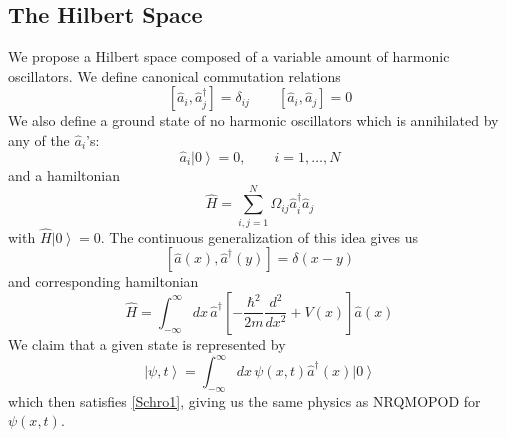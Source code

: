 \documentclass[10pt]{article}
\newcommand{\ket}[1]{\left|#1\right>}
\begin{document}
	\subsection{The Hilbert Space} 
	We propose a Hilbert space composed of a variable amount of harmonic oscillators. We define canonical commutation relations
	\begin{equation}\label{ccrs1} \left[\hat{a}_i,\hat{a}^\dag_j\right]=\delta_{ij} \qquad \left[\hat{a}_i, \hat{a}_j\right] = 0\end{equation}
	We also define a ground state of no harmonic oscillators which is annihilated by any of the $\hat{a}_i$'s:
	\begin{equation}\label{ground1} \hat{a}_i\ket{0} = 0,\qquad i=1,\ldots,N\end{equation}
	and a hamiltonian
	\begin{equation}\label{ham1} \hat{H} = \sum_{i,j=1}^N \Omega_{ij}\hat{a}^\dag_i\hat{a}_j\end{equation}
	with $\hat{H}\ket{0} = 0$. The continuous generalization of this idea gives us
	\begin{equation}\label{ccrs2} \left[\hat{a}(x), \hat{a}^\dag(y)\right] = \delta(x-y)\end{equation}
	and corresponding hamiltonian
	\begin{equation}\label{ham2} \hat{H} = \int_{-\infty}^\infty dx\,\hat{a}^\dag \left[-\frac{\hbar^2}{2m} \frac{d^2}{dx^2} + V(x)\right]\hat{a}(x)\end{equation}
	We claim that a given state is represented by
	\begin{equation} \label{state} \ket{\psi,t} = \int_{-\infty}^\infty dx\,\psi(x,t)\hat{a}^\dag(x)\ket{0}\end{equation}
	which then satisfies \eqref{Schro1}, giving us the same physics as NRQMOPOD for $\psi(x,t)$.
\end{document}

